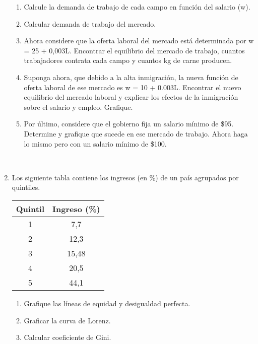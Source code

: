 \documentclass[11pt,letterpaper]{article}
\begin{document}
\begin{enumerate}
\begin{enumerate}    
\item Calcule la demanda de trabajo de cada campo en función del salario (w).\\
\item Calcular demanda de trabajo del mercado.\\
\item Ahora considere que la oferta laboral del mercado está determinada por w = 25 + 0,003L. Encontrar el equilibrio del mercado de trabajo, cuantos trabajadores contrata cada campo y cuantos kg de carne producen.\\
\item Suponga ahora, que debido a la alta inmigración, la nueva función de oferta laboral de ese mercado es w = 10 + 0.003L. Encontrar el nuevo equilibrio del mercado laboral y explicar los efectos de la inmigración sobre el salario y empleo. Grafique.\\
\item Por último, considere que el gobierno fija un salario mínimo de \$95. Determine y grafique que sucede en ese mercado de trabajo. Ahora haga lo mismo pero con un salario mínimo de \$100.\\
\end{enumerate}
\textbf{\Large{ }}\\

\hfill
\item Los siguiente tabla contiene los ingresos (en \%) de un país agrupados por quintiles.
        
    \begin{table}[H]
    \centering                      %
    \begin{tabular}{|c|c|}       
     \hline
    Quintil & Ingreso (\%) \\ \hline
     1  & 7,7  \\ \hline
     2  & 12,3 \\ \hline
     3  & 15,48 \\  \hline
     4  & 20,5 \\ \hline
     5  & 44,1 \\ \hline
    
    \end{tabular}
    \end{table}


\begin{enumerate}    
\item Grafique las líneas de equidad y desigualdad perfecta.\\
\item Graficar la curva de Lorenz.\\
\item Calcular coeficiente de Gini.\\

\end{enumerate}




\end{enumerate}
\end{document}
